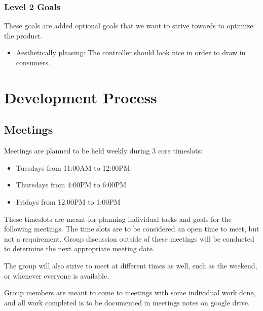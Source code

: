 \documentclass[a4]{article}
\begin{document}
\subsubsection{Level 2 Goals}
These goals are added optional goals that we want to strive towards to optimize the product.
\begin{itemize}
    \item \textcolor{McMasterMaroon}{Aesthetically pleasing}: The controller should look nice in order to draw in consumers.
\end{itemize}
\section{Development Process}
\subsection{Meetings}
Meetings are planned to be held weekly during 3 core timeslots:
\begin{itemize}
    \item Tuesdays from \textcolor{McMasterMaroon}{11:00AM to 12:00PM}
    \item Thursdays from \textcolor{McMasterMaroon}{4:00PM to 6:00PM}
    \item Fridays from \textcolor{McMasterMaroon}{12:00PM to 1:00PM}
\end{itemize}
These timeslots are meant for planning individual tasks and goals for the following meetings. The time slots are to be considered an open time to meet, but not a requirement. Group discussion outside of these meetings will be conducted to determine the next appropriate meeting date.

The group will also strive to meet at different times as well, such as the weekend, or whenever everyone is available.

Group members are meant to come to meetings with some individual work done, and all work completed is to be documented in meetings notes on google drive.
\end{document}
